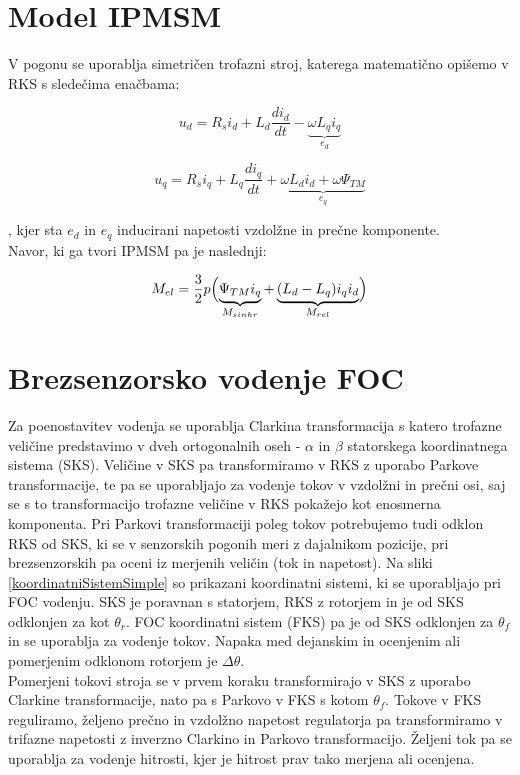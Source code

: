 \documentclass[a4paper,twoside,openright,12pt,slovene]{book}
\begin{document}
\section{Model IPMSM} \label{motor}

V pogonu se uporablja simetričen trofazni stroj, katerega matematično opišemo v RKS s sledečima enačbama:

\begin{equation} \label{motorModelD}
    u_d = R_si_d+L_d\frac{di_d}{dt}-\underbrace{\omega L_qi_q}_{e_d}
\end{equation}

\begin{equation} \label{motorModelQ}
    u_q = R_si_q+L_q\frac{di_q}{dt}+\underbrace{\omega L_di_d + \omega\Psi_{TM}}_{e_q}
\end{equation}

, kjer sta $e_d$ in $e_q$ inducirani napetosti vzdolžne in prečne komponente.
\\
Navor, ki ga tvori IPMSM pa je naslednji:

\begin{equation}
    M_{el} = \frac{3}{2}p\Bigl(\underbrace{\Psi_{TM}i_q}_{M_{sinhr}}+\underbrace{(L_d-L_q)i_qi_d}_{M_{rel}}\Bigr)
\end{equation}



\section{Brezsenzorsko vodenje FOC}

Za poenostavitev vodenja se uporablja Clarkina transformacija s katero trofazne veličine predstavimo v dveh ortogonalnih oseh - $\alpha$ in $\beta$ statorskega koordinatnega sistema (SKS). Veličine v
SKS pa transformiramo v RKS z uporabo Parkove transformacije, te pa se uporabljajo za vodenje tokov v vzdolžni in prečni osi, saj se s to transformacijo trofazne veličine v RKS pokažejo kot enosmerna 
komponenta. Pri Parkovi transformaciji poleg tokov potrebujemo tudi odklon RKS od SKS, ki se v senzorskih pogonih meri z dajalnikom pozicije, pri brezsenzorskih pa oceni iz merjenih veličin (tok in napetost). 
Na sliki \ref{koordinatniSistemSimple} so prikazani koordinatni sistemi, ki se uporabljajo pri FOC vodenju. SKS je poravnan s statorjem, RKS z rotorjem in je od SKS odklonjen za kot $\theta_r$. 
FOC koordinatni sistem (FKS) pa je od SKS odklonjen za $\theta_f$ in se uporablja za vodenje tokov. Napaka med dejanskim in ocenjenim ali pomerjenim odklonom rotorjem je $\Delta\theta$. 
\\
Pomerjeni tokovi stroja se v prvem koraku transformirajo v SKS z uporabo Clarkine transformacije, nato pa s Parkovo v FKS s kotom $\theta_f$. Tokove v FKS reguliramo, željeno prečno in vzdolžno
napetost regulatorja pa transformiramo v trifazne napetosti z inverzno Clarkino in Parkovo transformacijo. Željeni tok pa se uporablja za vodenje hitrosti, kjer je hitrost prav tako merjena ali
ocenjena.
\end{document}
